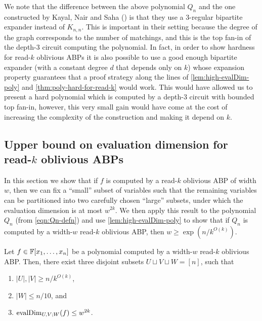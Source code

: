 \documentclass[11pt]{article}
\begin{document}
We note that the difference between the above polynomial $Q_n$ and the one constructed by Kayal, Nair and Saha (\cite{KNS15}) is that they use a 3-regular bipartite expander instead of $K_{n,n}$.  This is important in their setting because the degree of the graph corresponds to the number of matchings, and this is the top fan-in of the depth-3 circuit computing the polynomial. In fact, in order to show hardness for read-$k$ oblivious ABPs it is also possible to use a good enough bipartite expander (with a constant degree $d$ that depends only on $k$) whose expansion property guarantees that a proof strategy along the lines of \autoref{lem:high-evalDim-poly} and \autoref{thm:poly-hard-for-read-k} would work. This would have allowed us to present a hard polynomial which is computed by a depth-$3$ circuit with bounded top fan-in, however, this very small gain would have come at the cost of increasing the complexity of the construction and making it depend on $k$. %

\subsection{Upper bound on evaluation dimension for read-$k$ oblivious ABPs}

In this section we show that if $f$ is computed by a read-$k$ oblivious ABP of width $w$, then we can fix a ``small'' subset of variables such that the remaining variables can be partitioned into
two carefully chosen ``large'' subsets, under which the evaluation dimension is at most $w^{2k}$. We then apply this result to the polynomial $Q_n$ (from \eqref{eqn:Qn-defn}) and use \autoref{lem:high-evalDim-poly} to show that if $Q_n$ is computed by a width-$w$ read-$k$ oblivious ABP, then $w \ge \exp(n/k^{O(k)})$. 

\begin{theorem}
\label{thm:read-k-eval-dim}
Let $f \in \F[x_1, \ldots, x_n]$ be a polynomial computed by a width-$w$ read-$k$ oblivious ABP. Then, there exist three disjoint subsets $U \sqcup V \sqcup W = [n]$, such that 
\begin{enumerate}
\item $|U|, |V| \ge n/k^{O(k)}$,
\item $|W| \le n/10$, and
\item $\operatorname{evalDim}_{U,V;W}(f) \le w^{2k}$.
\end{enumerate}
\end{theorem}
\end{document}
